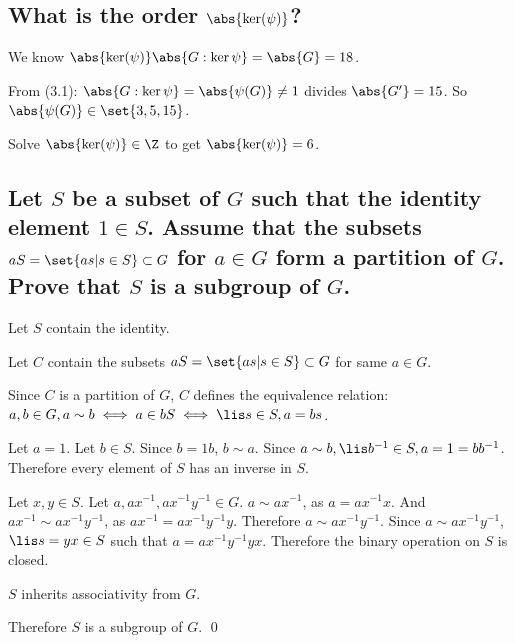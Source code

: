     \subsection[(ii)]{What is the order $\abs{\ker(\psi)}$?}
        We know $\abs{\ker(\psi)}\abs{G:\ker{\psi}} = \abs{G} = 18$.

        From (3.1): $\abs{G:\ker{\psi}} = \abs{\psi(G)} \neq 1$ divides $\abs{G'} = 15$.
        So $\abs{\psi(G)} \in \set{3,5,15}$.

        Solve $\abs{\ker(\psi)} \in \Z$ to get $\abs{\ker(\psi)} = 6$.

    \subsection[(iii)]{Let $S$ be a subset of $G$ such that the identity element $1\in S$.
        Assume that the subsets $aS = \set{as|s\in S} \subset G$ for $a \in G$ form a partition of $G$.
        Prove that $S$ is a subgroup of $G$.}


        Let $S$ contain the identity.

        Let $C$ contain
        the subsets $aS = \set{as|s\in S} \subset G$ for same $a\in G$.

        Since $C$ is a partition of $G$, $C$ defines the equivalence relation: 
        $a,b \in G, a \sim b \iff a \in bS \iff \lis s \in S, a = bs$.

        Let $a = 1$.
        Let $b \in S$.
        Since $b = 1b$, $b \sim a$.
        Since $a \sim b, \lis b^{-1} \in S, a = 1 = bb^{-1}$. 
        Therefore every element of $S$ has an inverse in $S$.

        Let $x,y \in S$.
        Let $a, a x^{-1}, ax^{-1}y^{-1} \in G$.
        $a \sim ax^{-1}$, as $a = ax^{-1}x$.
        And $ax^{-1} \sim ax^{-1}y^{-1}$, as $ax^{-1} = ax^{-1}y^{-1}y$.
        Therefore $a \sim ax^{-1}y^{-1}$.
        Since $a \sim ax^{-1}y^{-1}$,
        $\lis s = yx \in S$ such that $a = ax^{-1} y^{-1} yx$.
        Therefore the binary operation on $S$ is closed.

        $S$ inherits associativity from $G$.

        Therefore $S$ is a subgroup of $G$.
        \qed

